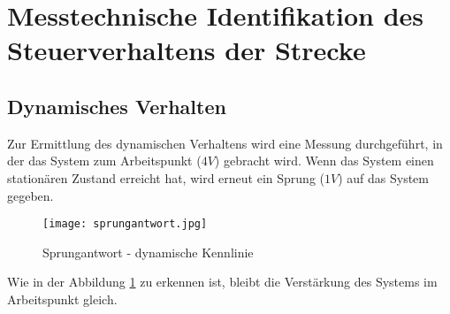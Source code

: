 








\newpage
[Perkowski]
\section{Messtechnische Identifikation des Steuerverhaltens der Strecke}\label{Kapitel3}


\subsection{Dynamisches Verhalten}

Zur Ermittlung des dynamischen Verhaltens wird eine Messung durchgeführt, in der das System zum Arbeitspunkt ($4V$) gebracht wird. Wenn das System einen stationären Zustand erreicht hat, wird erneut ein Sprung ($1V$) auf das System gegeben.

\begin{figure}[h]
	\begin{center}
		\texttt{[image: sprungantwort.jpg]}
		\caption{Sprungantwort - dynamische Kennlinie}
       \label{dynsprant}
	\end{center} 
\end{figure}

Wie in der Abbildung \ref{dynsprant} zu erkennen ist, bleibt die Verstärkung des Systems im Arbeitspunkt gleich.

